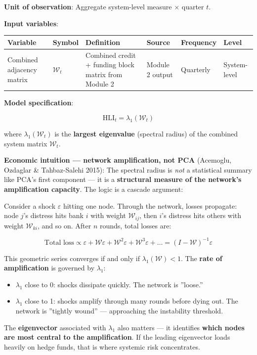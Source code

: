 \documentclass[11pt,a4paper]{article}
\begin{document}
\textbf{Unit of observation}: Aggregate system-level measure $\times$ quarter $t$.

\textbf{Input variables}:


{\small
\begin{longtable}{|p{}|p{}|p{}|p{}|p{}|p{}|}
\hline
\textbf{Variable} & \textbf{Symbol} & \textbf{Definition} & \textbf{Source} & \textbf{Frequency} & \textbf{Level} \\
\hline
\endhead
Combined adjacency matrix & $\mathcal{W}_t$ & Combined credit + funding block matrix from Module 2 & Module 2 output & Quarterly & System-level \\
\hline
\end{longtable}
}

\textbf{Model specification}:

\[\text{HLI}_t = \lambda_1(\mathcal{W}_t)\]

where $\lambda_1(\mathcal{W}_t)$ is the \textbf{largest eigenvalue} (spectral radius) of the combined system matrix $\mathcal{W}_t$.

\textbf{Economic intuition --- network amplification, not PCA} (Acemoglu, Ozdaglar \& Tahbaz-Salehi 2015): The spectral radius is \textit{not} a statistical summary like PCA's first component --- it is a \textbf{structural measure of the network's amplification capacity}. The logic is a cascade argument:

Consider a shock $\varepsilon$ hitting one node. Through the network, losses propagate: node $j$'s distress hits bank $i$ with weight $\mathcal{W}_{ij}$, then $i$'s distress hits others with weight $\mathcal{W}_{ki}$, and so on. After $n$ rounds, total losses are:

\[\text{Total loss} \propto \varepsilon + \mathcal{W}\varepsilon + \mathcal{W}^2\varepsilon + \mathcal{W}^3\varepsilon + \ldots = (I - \mathcal{W})^{-1}\varepsilon\]

This geometric series converges if and only if $\lambda_1(\mathcal{W}) < 1$. The \textbf{rate of amplification} is governed by $\lambda_1$:
\begin{itemize}
\item $\lambda_1$ close to 0: shocks dissipate quickly. The network is ''loose.''
\item $\lambda_1$ close to 1: shocks amplify through many rounds before dying out. The network is ''tightly wound'' --- approaching the instability threshold.

\end{itemize}
The \textbf{eigenvector} associated with $\lambda_1$ also matters --- it identifies \textbf{which nodes are most central to the amplification}. If the leading eigenvector loads heavily on hedge funds, that is where systemic risk concentrates.
\end{document}
